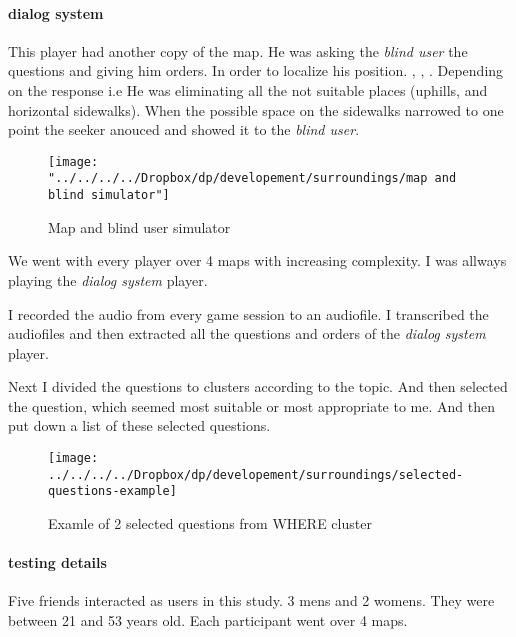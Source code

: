 				\paragraph{dialog system}
					This player had another copy of the map. He was asking the \emph{blind user} the questions and giving him orders. In order to localize his position. , , . Depending on the response i.e  He was
					eliminating all the not suitable places (uphills, and horizontal sidewalks). When the possible
					space on the sidewalks narrowed to one point the seeker anouced 
					and showed it to the \emph{blind user}.	
				
				\begin{figure}[th]
					\centering
					\texttt{[image: "../../../../Dropbox/dp/developement/surroundings/map and blind simulator"]}
					\caption{Map and blind user simulator}
					\label{fig:map-and-blind-simulator}
				\end{figure}
				
				We went with every player over 4 maps with increasing complexity. 
				I was allways playing the \emph{dialog system} player.
				
				I recorded the audio from every game session to an audiofile. I transcribed the audiofiles and then extracted all the questions and orders of the \emph{dialog system} player.
				
				Next I divided the questions to clusters according to the topic. And then selected the question, which seemed most suitable or most appropriate to me. And then put down a list of these selected questions.
			
				\begin{figure}[th]
					\centering
					\texttt{[image: ../../../../Dropbox/dp/developement/surroundings/selected-questions-example]}
					\caption{Examle of 2 selected questions from WHERE cluster}
					\label{fig:clusteredquestions}
				\end{figure}
			
				\paragraph{testing details}
				Five friends interacted as users in this study. 3 mens and 2 womens. They were between 21 and 53 years old. Each participant went over 4 maps.
			
